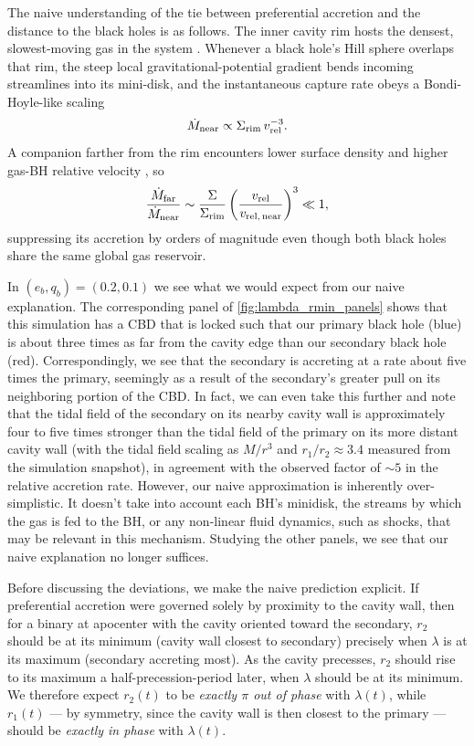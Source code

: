 \documentclass[fleqn,usenatbib]{mnras}
\begin{document}
The naive understanding of the tie between preferential accretion and the distance to the black holes is as follows. The inner cavity rim hosts the densest, slowest-moving gas in the system \citep{shi_2012, farris_2014, duffell_dorazio_2020}. Whenever a black hole's Hill sphere overlaps that rim, the steep local gravitational-potential gradient bends incoming streamlines into its mini-disk, and the instantaneous capture rate obeys a Bondi-Hoyle-like scaling
\begin{equation}
  \dot{M}_{\rm near} \propto \Sigma_{\rm rim} \, v_{\rm rel}^{-3}.
\end{equation}
A companion farther from the rim encounters lower surface density and higher gas-BH relative velocity \citep{miranda_munoz_lai_2017, dorazio_duffel}, so
\begin{equation}
  \frac{\dot{M}_{\rm far}}{\dot{M}_{\rm near}} \sim \frac{\Sigma}{\Sigma_{\rm rim}} \left(\frac{v_{\rm rel}}{v_{\rm rel,\,near}}\right)^{3} \ll 1,
\end{equation}
suppressing its accretion by orders of magnitude even though both black holes share the same global gas reservoir.


In $(e_b, q_b) = (0.2, 0.1)$ we see what we would expect from our naive explanation. The corresponding panel of \autoref{fig:lambda_rmin_panels} shows that this simulation has a CBD that is locked such that our primary black hole (blue) is about three times as far from the cavity edge than our secondary black hole (red). Correspondingly, we see that the secondary is accreting at a rate about five times the primary, seemingly as a result of the secondary's greater pull on its neighboring portion of the CBD. In fact, we can even take this further and note that the tidal field of the secondary on its nearby cavity wall is approximately four to five times stronger than the tidal field of the primary on its more distant cavity wall (with the tidal field scaling as $M/r^3$ and $r_1/r_2 \approx 3.4$ measured from the simulation snapshot), in agreement with the observed factor of $\sim 5$ in the relative accretion rate. However, our naive approximation is inherently over-simplistic. It doesn't take into account each BH's minidisk, the streams by which the gas is fed to the BH, or any non-linear fluid dynamics, such as shocks, that may be relevant in this mechanism. Studying the other panels, we see that our naive explanation no longer suffices.

Before discussing the deviations, we make the naive prediction explicit. If preferential accretion were governed solely by proximity to the cavity wall, then for a binary at apocenter with the cavity oriented toward the secondary, $r_2$ should be at its minimum (cavity wall closest to secondary) precisely when $\lambda$ is at its maximum (secondary accreting most). As the cavity precesses, $r_2$ should rise to its maximum a half-precession-period later, when $\lambda$ should be at its minimum. We therefore expect $r_2(t)$ to be \textit{exactly $\pi$ out of phase} with $\lambda(t)$, while $r_1(t)$ --- by symmetry, since the cavity wall is then closest to the primary --- should be \textit{exactly in phase} with $\lambda(t)$.
\end{document}
